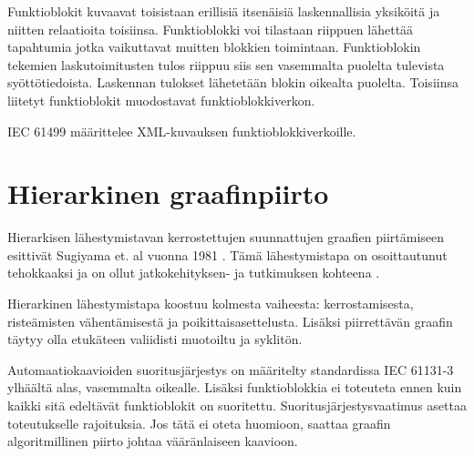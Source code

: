 \documentclass[finnish,12pt]{article}
\begin{document}
Funktioblokit kuvaavat toisistaan erillisiä itsenäisiä laskennallisia yksiköitä ja niitten relaatioita toisiinsa. Funktioblokki voi tilastaan riippuen lähettää tapahtumia jotka vaikuttavat muitten blokkien toimintaan. Funktioblokin tekemien laskutoimitusten tulos riippuu siis sen vasemmalta puolelta tulevista syöttötiedoista. Laskennan tulokset lähetetään blokin oikealta puolelta. Toisiinsa liitetyt funktioblokit muodostavat funktioblokkiverkon. 

IEC 61499 määrittelee XML-kuvauksen funktioblokkiverkoille.




	\clearpage
	\section{Hierarkinen graafinpiirto}

Hierarkisen lähestymistavan kerrostettujen suunnattujen graafien piirtämiseen esittivät Sugiyama et. al vuonna 1981 \cite{RefWorks:9}. Tämä lähestymistapa on osoittautunut tehokkaaksi ja on ollut jatkokehityksen- ja tutkimuksen kohteena \cite{RefWorks:28}.

Hierarkinen lähestymistapa koostuu kolmesta vaiheesta: kerrostamisesta, risteämisten vähentämisestä ja poikittaisasettelusta. Lisäksi piirrettävän graafin täytyy olla etukäteen valiidisti muotoiltu ja syklitön.

Automaatiokaavioiden suoritusjärjestys on määritelty standardissa IEC 61131-3 ylhäältä alas, vasemmalta oikealle. Lisäksi funktioblokkia ei toteuteta ennen kuin kaikki sitä edeltävät funktioblokit on suoritettu. Suoritusjärjestysvaatimus asettaa toteutukselle rajoituksia. Jos tätä ei oteta huomioon, saattaa graafin algoritmillinen piirto johtaa vääränlaiseen kaavioon.
\end{document}
